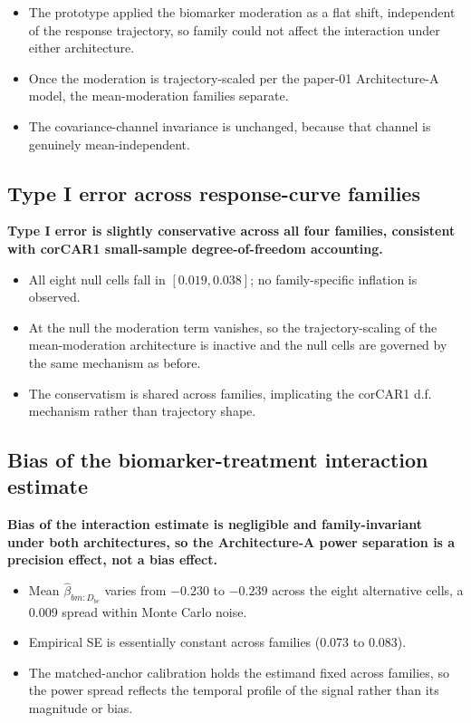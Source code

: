 \documentclass[
  11pt,
]{article}
\begin{document}
\begin{itemize}\setlength{\itemsep}{2pt}\setlength{\parskip}{0pt}
\item The prototype applied the biomarker moderation as a flat
  shift, independent of the response trajectory, so family could
  not affect the interaction under either architecture.
\item Once the moderation is trajectory-scaled per the paper-01
  Architecture-A model, the mean-moderation families separate.
\item The covariance-channel invariance is unchanged, because
  that channel is genuinely mean-independent.
\end{itemize}

\subsection{Type I error across response-curve families}\label{type-i-error-across-response-curve-families}

\textbf{Type I error is slightly conservative across all four
families, consistent with corCAR1 small-sample
degree-of-freedom accounting.}

\begin{itemize}\setlength{\itemsep}{2pt}\setlength{\parskip}{0pt}
\item All eight null cells fall in $[0.019, 0.038]$; no
  family-specific inflation is observed.
\item At the null the moderation term vanishes, so the
  trajectory-scaling of the mean-moderation architecture is inactive and the
  null cells are governed by the same mechanism as before.
\item The conservatism is shared across families, implicating
  the corCAR1 d.f. mechanism rather than trajectory shape.
\end{itemize}

\subsection{Bias of the biomarker-treatment interaction estimate}\label{bias-of-the-biomarker-treatment-interaction-estimate}

\textbf{Bias of the interaction estimate is negligible and
family-invariant under both architectures, so the
Architecture-A power separation is a precision effect, not a
bias effect.}

\begin{itemize}\setlength{\itemsep}{2pt}\setlength{\parskip}{0pt}
\item Mean $\hat\beta_{bm:D_{bc}}$ varies from $-0.230$ to
  $-0.239$ across the eight alternative cells, a 0.009
  spread within Monte Carlo noise.
\item Empirical SE is essentially constant across families
  (0.073 to 0.083).
\item The matched-anchor calibration holds the estimand fixed
  across families, so the power spread reflects the temporal
  profile of the signal rather than its magnitude or bias.
\end{itemize}
\end{document}
